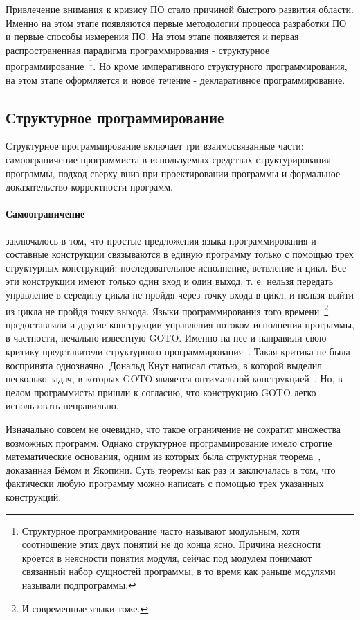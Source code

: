 Привлечение внимания к кризису ПО стало причиной быстрого развития области. Именно на этом этапе появляются первые методологии процесса разработки ПО и первые способы измерения ПО. На этом этапе появляется и первая распространенная парадигма программирования - структурное программирование~\footnote{Структурное программирование часто называют модульным, хотя соотношение этих двух понятий не до конца ясно. Причина неясности кроется в неясности понятия модуля, сейчас под модулем понимают связанный набор сущностей программы, в то время как раньше модулями называли подпрограммы.}. Но кроме императивного структурного программирования, на этом этапе оформляется и новое течение - декларативное программирование.

\subsection{Структурное программирование}

Структурное программирование включает три взаимосвязанные части: самоограничение программиста в используемых средствах структурирования программы, подход сверху-вниз при проектировании программы и формальное доказательство корректности программ.

\paragraph{Самоограничение} заключалось в том, что простые предложения языка программирования и составные конструкции связываются в единую программу только с помощью трех структурных конструкций: последовательное исполнение, ветвление и цикл. Все эти конструкции имеют только один вход и один выход, т. е. нельзя передать управление в середину цикла не пройдя через точку входа в цикл, и нельзя выйти из цикла не пройдя точку выхода. Языки программирования того времени~\footnote{И современные языки тоже.} предоставляли и другие конструкции управления потоком исполнения программы, в частности, печально известную GOTO. Именно на нее и направили свою критику представители структурного программирования~\cite{Dijkstra:1968:LEG}. Такая критика не была воспринята однозначно. Дональд Кнут написал статью, в которой выделил несколько задач, в которых GOTO является оптимальной конструкцией~\cite{Knuth:1974:SPG}. Но, в целом программисты пришли к согласию, что конструкцию GOTO легко использовать неправильно.

Изначально совсем не очевидно, что такое ограничение не сократит множества возможных программ. Однако структурное программирование имело строгие математические основания, одним из которых была структурная теорема~\cite{SPT}, доказанная Бёмом и Якопини. Суть теоремы как раз и заключалась в том, что фактически любую программу можно написать с помощью трех указанных конструкций.

